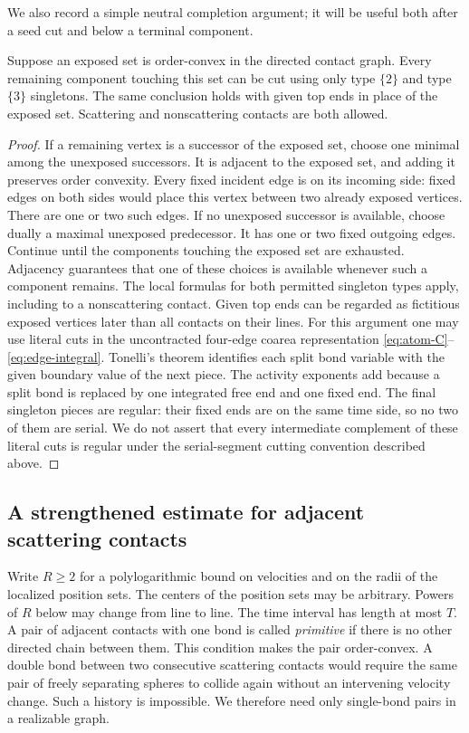 We also record a simple neutral completion argument; it will be useful
both after a seed cut and below a terminal component.

\begin{lemma}\label{lem:cutoff-neutral}
Suppose an exposed set is order-convex in the directed contact graph.
Every remaining component touching this set can be cut using only
type \(\{2\}\) and type \(\{3\}\) singletons.
The same conclusion holds with given top ends in place of the
exposed set.  Scattering and nonscattering contacts are both allowed.
\end{lemma}

\begin{proof}
If a remaining vertex is a successor of the exposed set, choose one
minimal among the unexposed successors.  It is adjacent to the exposed
set, and adding it preserves order convexity.  Every fixed incident
edge is on its incoming side: fixed edges on both sides would place
this vertex between two already exposed vertices.  There are one or
two such edges.  If no unexposed successor is available, choose
dually a maximal unexposed predecessor.  It has one or two fixed
outgoing edges.  Continue until the components touching the exposed
set are exhausted.  Adjacency guarantees that one of these choices is
available whenever such a component remains.  The local formulas for
both permitted singleton types apply, including to a nonscattering
contact.  Given top ends can be regarded as fictitious exposed
vertices later than all contacts on their lines.
For this argument one may use literal cuts in the uncontracted
four-edge coarea representation
\eqref{eq:atom-C}--\eqref{eq:edge-integral}.
Tonelli's theorem identifies each split bond variable with the
given boundary value of the next piece.  The activity exponents
add because a split bond is replaced by one integrated free end
and one fixed end.  The final singleton pieces are regular:
their fixed ends are on the same time side, so no two of them
are serial.  We do not assert that every intermediate complement
of these literal cuts is regular under the serial-segment
cutting convention described above.
\end{proof}

\subsection{A strengthened estimate for adjacent scattering contacts}

Write \(R\geq2\) for a polylogarithmic bound on velocities and on the
radii of the localized position sets.  The centers of the position
sets may be arbitrary.  Powers of \(R\) below may change from line to
line.  The time interval has length at most \(T\).
A pair of adjacent contacts with one bond is called \emph{primitive}
if there is no other directed chain between them.
This condition makes the pair order-convex.
A double bond between two consecutive scattering contacts would
require the same pair of freely separating spheres to collide again
without an intervening velocity change.  Such a history is impossible.
We therefore need only single-bond pairs in a realizable graph.

